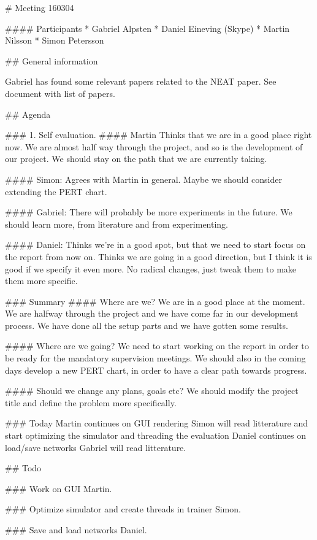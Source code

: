# Meeting 160304

#### Participants
* Gabriel Alpsten
* Daniel Eineving (Skype)
* Martin Nilsson
* Simon Petersson

## General information

Gabriel has found some relevant papers related to the NEAT paper. See document with list of papers.

## Agenda

### 1. Self evaluation.
#### Martin
Thinks that we are in a good place right now. We are almost half way through the project, and so is the development of our project. We should stay on the path that we are currently taking.

#### Simon:
Agrees with Martin in general. Maybe we should consider extending the PERT chart.

#### Gabriel:
There will probably be more experiments in the future. We should learn more, from literature and from experimenting.

#### Daniel:
Thinks we're in a good spot, but that we need to start focus on the report from now on.
Thinks we are going in a good direction, but I think it is good if we specify it even more.
No radical changes, just tweak them to make them more specific.

### Summary
#### Where are we?
We are in a good place at the moment. We are halfway through the project and we have come far in our development process. We have done all the setup parts and we have gotten some results.

#### Where are we going?
We need to start working on the report in order to be ready for the mandatory supervision meetings. We should also in the coming days develop a new PERT chart, in order to have a clear path towards progress.

#### Should we change any plans, goals etc?
We should modify the project title and define the problem more specifically.

### Today
Martin continues on GUI rendering
Simon will read litterature and start optimizing the simulator and threading the evaluation
Daniel continues on load/save networks
Gabriel will read litterature.

## Todo

### Work on GUI
Martin.

### Optimize simulator and create threads in trainer
Simon.

### Save and load networks
Daniel.
